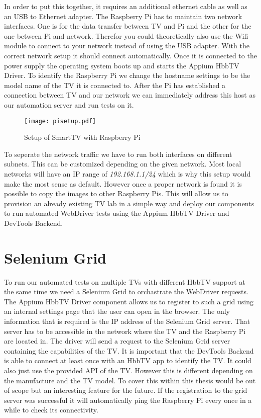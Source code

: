In order to put this together, it requires an additional ethernet cable as well as an USB to Ethernet
adapter. The Raspberry Pi has to maintain two network interfaces. One is for the data transfer between
TV and Pi and the other for the one between Pi and network. Therefor you could theoretically also use
the Wifi module to connect to your network instead of using the USB adapter. With the correct network
setup it should connect automatically. Once it is connected to the power supply the operating system
boots up and starts the Appium HbbTV Driver. To identify the Raspberry Pi we change the hostname
settings to be the model name of the TV it is connected to. After the Pi has established a connection
between TV and our network we can immediately address this host as our automation server and run tests
on it.

\vspace{1cm}
\begin{figure}[htb]
  \centering
  \texttt{[image: pisetup.pdf]}\\
  \caption{Setup of SmartTV with Raspberry Pi}\label{fig:pisetup}
\end{figure}
\vspace{0.5cm}

To seperate the network traffic we have to run both interfaces on different subnets. This can be
customized depending on the given network. Most local networks will have an IP range of
\textit{192.168.1.1/24} which is why this setup would make the most sense as default. However
once a proper network is found it is possible to copy the images to other Raspberry Pis. This will
allow us to provision an already existing TV lab in a simple way and deploy our components to run
automated WebDriver tests using the Appium HbbTV Driver and DevTools Backend.

\section{Selenium Grid\label{sec:grid}}

To run our automated tests on multiple TVs with different HbbTV support at the same time we need
a Selenium Grid to orchastrate the WebDriver requests. The Appium HbbTV Driver component allows us
to register to such a grid using an internal settings page that the user can open in the browser.
The only information that is required is the IP address of the Selenium Grid server. That server
has to be accessible in the network where the TV and the Raspberry Pi are located in. The driver
will send a request to the Selenium Grid server containing the capabilities of the TV. It is
important that the DevTools Backend is able to connect at least once with an HbbTV app to identify
the TV. It could also just use the provided API of the TV. However this is different depending on
the manufacture and the TV model. To cover this within this thesis would be out of scope but an
interesting feature for the future. If the registration to the grid server was successful it will
automatically ping the Raspberry Pi every once in a while to check its connectivity.

